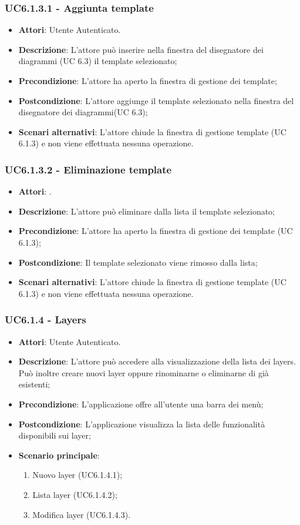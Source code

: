 \subsubsection{UC6.1.3.1 - Aggiunta template} 
\label{sssec:UC6.1.3.1} 
\begin{itemize} 
\item \textbf{Attori}: Utente Autenticato.
\item \textbf{Descrizione}: L'attore può inserire nella finestra del disegnatore dei diagrammi (UC 6.3) il template selezionato;
\item \textbf{Precondizione}: L'attore ha aperto la finestra di gestione dei template;
\item \textbf{Postcondizione}: L'attore aggiunge il template selezionato nella finestra del disegnatore dei diagrammi(UC 6.3);
\item \textbf{Scenari alternativi}: L'attore chiude la finestra di gestione template (UC 6.1.3) e non viene effettuata nessuna operazione.
\end{itemize} 
\subsubsection{UC6.1.3.2 - Eliminazione template} 
\label{sssec:UC6.1.3.2} 
\begin{itemize} 
\item \textbf{Attori}: .
\item \textbf{Descrizione}: L'attore può eliminare dalla lista il template selezionato;
\item \textbf{Precondizione}: L'attore ha aperto la finestra di gestione dei template (UC 6.1.3);
\item \textbf{Postcondizione}: Il template selezionato viene rimosso dalla lista;
\item \textbf{Scenari alternativi}: L'attore chiude la finestra di gestione template (UC 6.1.3) e non viene effettuata nessuna operazione.
\end{itemize} 
\subsubsection{UC6.1.4 - Layers} 
\label{sssec:UC6.1.4} 
\begin{itemize} 
\item \textbf{Attori}: Utente Autenticato.
\item \textbf{Descrizione}: L’attore  può accedere alla visualizzazione della lista dei layers. Può inoltre creare nuovi layer oppure rinominarne o eliminarne di già esistenti;
\item \textbf{Precondizione}: L’applicazione offre all’utente una barra dei menù;
\item \textbf{Postcondizione}: L'applicazione visualizza la lista delle funzionalità disponibili sui layer;
\item \textbf{Scenario principale}: \begin{enumerate}\item Nuovo layer (UC6.1.4.1);\item Lista layer (UC6.1.4.2);\item Modifica layer (UC6.1.4.3). 
 \end{enumerate}
\end{itemize} 
